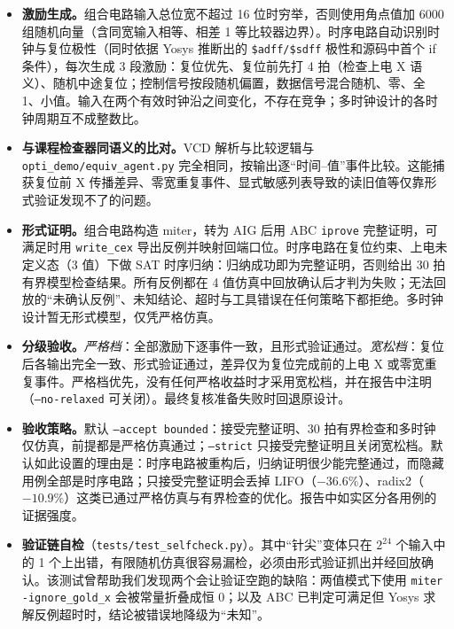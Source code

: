 \documentclass[UTF8,a4paper,zihao=5]{ctexart}
\newcommand{\code}[1]{\texttt{#1}}
\begin{document}
\begin{itemize}
\item \textbf{激励生成。}组合电路输入总位宽不超过 16 位时穷举，否则使用角点值加 6000 组随机向量（含同宽输入相等、相差 1 等比较器边界）。时序电路自动识别时钟与复位极性（同时依据 Yosys 推断出的 \code{\$adff/\$sdff} 极性和源码中首个 if 条件），每次生成 3 段激励：复位优先、复位前先打 4 拍（检查上电 X 语义）、随机中途复位；控制信号按段随机偏置，数据信号混合随机、零、全 1、小值。输入在两个有效时钟沿之间变化，不存在竞争；多时钟设计的各时钟周期互不成整数比。
\item \textbf{与课程检查器同语义的比对。}VCD 解析与比较逻辑与 \code{opti\_demo/equiv\_agent.py} 完全相同，按输出逐“时间–值”事件比较。这能捕获复位前 X 传播差异、零宽重复事件、显式敏感列表导致的读旧值等仅靠形式验证发现不了的问题。
\item \textbf{形式证明。}组合电路构造 miter，转为 AIG 后用 ABC \code{iprove} 完整证明，可满足时用 \code{write\_cex} 导出反例并映射回端口位。时序电路在复位约束、上电未定义态（3 值）下做 SAT 时序归纳：归纳成功即为完整证明，否则给出 30 拍有界模型检查结果。所有反例都在 4 值仿真中回放确认后才判为失败；无法回放的“未确认反例”、未知结论、超时与工具错误在任何策略下都拒绝。多时钟设计暂无形式模型，仅凭严格仿真。
\item \textbf{分级验收。}\emph{严格档}：全部激励下逐事件一致，且形式验证通过。\emph{宽松档}：复位后各输出完全一致、形式验证通过，差异仅为复位完成前的上电 X 或零宽重复事件。严格档优先，没有任何严格收益时才采用宽松档，并在报告中注明（\code{--no-relaxed} 可关闭）。最终复核准备失败时回退原设计。
\item \textbf{验收策略。}默认 \code{--accept bounded}：接受完整证明、30 拍有界检查和多时钟仅仿真，前提都是严格仿真通过；\code{--strict} 只接受完整证明且关闭宽松档。默认如此设置的理由是：时序电路被重构后，归纳证明很少能完整通过，而隐藏用例全部是时序电路；只接受完整证明会丢掉 LIFO（$-36.6\%$）、radix2（$-10.9\%$）这类已通过严格仿真与有界检查的优化。报告中如实区分各用例的证据强度。
\item \textbf{验证链自检}（\code{tests/test\_selfcheck.py}）。其中“针尖”变体只在 $2^{24}$ 个输入中的 1 个上出错，有限随机仿真很容易漏检，必须由形式验证抓出并经回放确认。该测试曾帮助我们发现两个会让验证空跑的缺陷：两值模式下使用 \code{miter -ignore\_gold\_x} 会被常量折叠成恒 0；以及 ABC 已判定可满足但 Yosys 求解反例超时时，结论被错误地降级为“未知”。
\end{itemize}

\end{document}
